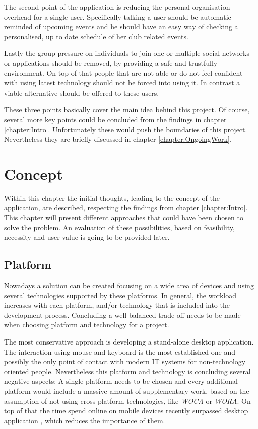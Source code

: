 The second point of the application is reducing the personal organisation overhead for a single user. Specifically talking a user should be automatic reminded of upcoming events and he should have an easy way of checking a personalised, up to date schedule of her club related events.

Lastly the group pressure on individuals to join one or multiple social networks or applications should be removed, by providing a safe and trustfully environment. On top of that people that are not able or do not feel confident with using latest technology should not be forced into using it. In contrast a viable alternative should be offered to these users. 

These three points basically cover the main idea behind this project. Of course, several more key points could be concluded from the findings in chapter \vref{chapter:Intro}. Unfortunately these would push the boundaries of this project. Nevertheless they are briefly discussed in chapter \vref{chapter:OngoingWork}.

\chapter{Concept}
Within this chapter the initial thoughts, leading to the concept of the application, are described, respecting the findings from chapter \ref{chapter:Intro}. This chapter will present different approaches that could have been chosen to solve the problem. An evaluation of these possibilities, based on feasibility, necessity and user value is going to be provided later.

\section{Platform} %
Nowadays a solution can be created focusing on a wide area of devices and using several technologies supported by these platforms. In general, the workload increases with each platform, and/or technology that is included into the development process. Concluding a well balanced trade-off needs to be made when choosing platform and technology for a project.

The most conservative approach is developing a stand-alone desktop application. The interaction using mouse and keyboard is the most established one and possibly the only point of contact with modern \acrshort{IT} systems for non-technology oriented people. Nevertheless this platform and technology is concluding several negative aspects: A single platform needs to be chosen and every additional platform would include a massive amount of supplementary work, based on the assumption of not using cross platform technologies, like \emph{\Acrfull{WOCA}} or \emph{\Acrfull{WORA}}. On top of that the time spend online on mobile devices recently surpassed desktop application \cite{Murtagh:2014aa}, which reduces the importance of them. 

